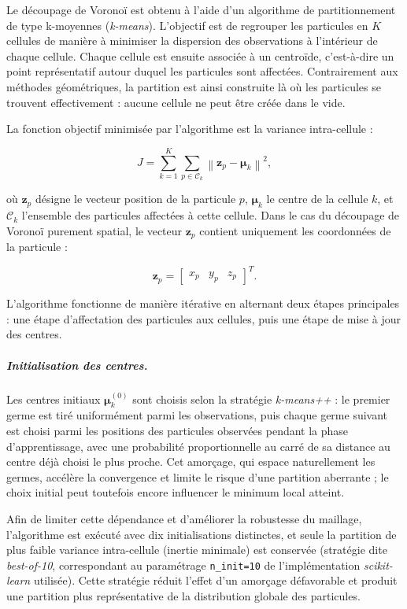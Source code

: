 \documentclass[french]{MemoireMaster}
\begin{document}
Le découpage de Voronoï est obtenu à l'aide d'un algorithme de partitionnement de type k-moyennes (\textit{k-means}). L'objectif est de regrouper les particules en $K$ cellules de manière à minimiser la dispersion des observations à l'intérieur de chaque cellule. Chaque cellule est ensuite associée à un centroïde, c'est-à-dire un point représentatif autour duquel les particules sont affectées. Contrairement aux méthodes géométriques, la partition est ainsi construite là où les particules se trouvent effectivement : aucune cellule ne peut être créée dans le vide.

La fonction objectif minimisée par l'algorithme est la variance intra-cellule :

\begin{equation}
  J
  =
  \sum_{k=1}^{K}
  \sum_{p \in \mathcal{C}_k}
  \left\|
    \mathbf{z}_p - \boldsymbol{\mu}_k
  \right\|^2,
  \label{eq:kmeans}
\end{equation}

où $\mathbf{z}_p$ désigne le vecteur position de la particule $p$, $\boldsymbol{\mu}_k$ le centre de la cellule $k$, et $\mathcal{C}_k$ l'ensemble des particules affectées à cette cellule. Dans le cas du découpage de Voronoï purement spatial, le vecteur $\mathbf{z}_p$ contient uniquement les coordonnées de la particule :

\[
  \mathbf{z}_p =
  \begin{bmatrix}
    x_p & y_p & z_p
  \end{bmatrix}^T .
\]

L'algorithme fonctionne de manière itérative en alternant deux étapes principales : une étape d'affectation des particules aux cellules, puis une étape de mise à jour des centres.

\subparagraph{Initialisation des centres.}
Les centres initiaux $\boldsymbol{\mu}_k^{(0)}$ sont choisis selon la stratégie \textit{k-means++} : le premier germe est tiré uniformément parmi les observations, puis chaque germe suivant est choisi parmi les positions des particules observées pendant la phase d'apprentissage, avec une probabilité proportionnelle au carré de sa distance au centre déjà choisi le plus proche. Cet amorçage, qui espace naturellement les germes, accélère la convergence et limite le risque d'une partition aberrante ; le choix initial peut toutefois encore influencer le minimum local atteint.

Afin de limiter cette dépendance et d'améliorer la robustesse du maillage, l'algorithme est exécuté avec dix initialisations distinctes, et seule la partition de plus faible variance intra-cellule (inertie minimale) est conservée (stratégie dite \textit{best-of-10}, correspondant au paramétrage \texttt{n\_init=10} de l'implémentation \textit{scikit-learn} utilisée). Cette stratégie réduit l'effet d'un amorçage défavorable et produit une partition plus représentative de la distribution globale des particules.
\end{document}
